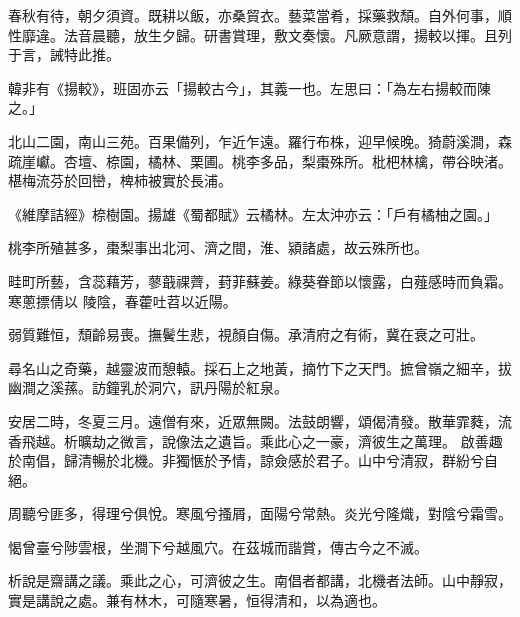 \begin{pinyinscope}
春秋有待，朝夕須資。既耕以飯，亦桑貿衣。藝菜當肴，採藥救頹。自外何事，順性靡違。法音晨聽，放生夕歸。研書賞理，敷文奏懷。凡厥意謂，揚較以揮。且列于言，誡特此推。



 韓非有《揚較》，班固亦云「揚較古今」，其義一也。左思曰：「為左右揚較而陳之。」


北山二園，南山三苑。百果備列，乍近乍遠。羅行布株，迎早候晚。猗蔚溪澗，森疏崖巘。杏壇、㮈園，橘林、栗圃。桃李多品，梨棗殊所。枇杷林檎，帶谷映渚。椹梅流芬於回巒，椑柿被實於長浦。



 《維摩詰經》㮈樹園。揚雄《蜀都賦》云橘林。左太沖亦云：「戶有橘柚之園。」



 桃李所殖甚多，棗梨事出北河、濟之間，淮、潁諸處，故云殊所也。


畦町所藝，含蕊藉芳，蓼蕺祼薺，葑菲蘇姜。綠葵眷節以懷露，白薤感時而負霜。寒蔥摽倩以
 陵陰，春藿吐苕以近陽。



 弱質難恒，頹齡易喪。撫鬢生悲，視顏自傷。承清府之有術，冀在衰之可壯。


尋名山之奇藥，越靈波而憩轅。採石上之地黃，摘竹下之天門。摭曾嶺之細辛，拔幽澗之溪蓀。訪鐘乳於洞穴，訊丹陽於紅泉。



 安居二時，冬夏三月。遠僧有來，近眾無闕。法鼓朗響，頌偈清發。散華霏蕤，流香飛越。析曠劫之微言，說像法之遺旨。乘此心之一豪，濟彼生之萬理。
 啟善趣於南倡，歸清暢於北機。非獨愜於予情，諒僉感於君子。山中兮清寂，群紛兮自絕。



 周聽兮匪多，得理兮俱悅。寒風兮搔屑，面陽兮常熱。炎光兮隆熾，對陰兮霜雪。


愒曾臺兮陟雲根，坐澗下兮越風穴。在茲城而諧賞，傳古今之不滅。



 析說是齋講之議。乘此之心，可濟彼之生。南倡者都講，北機者法師。山中靜寂，實是講說之處。兼有林木，可隨寒暑，恒得清和，以為適也。




\end{pinyinscope}
